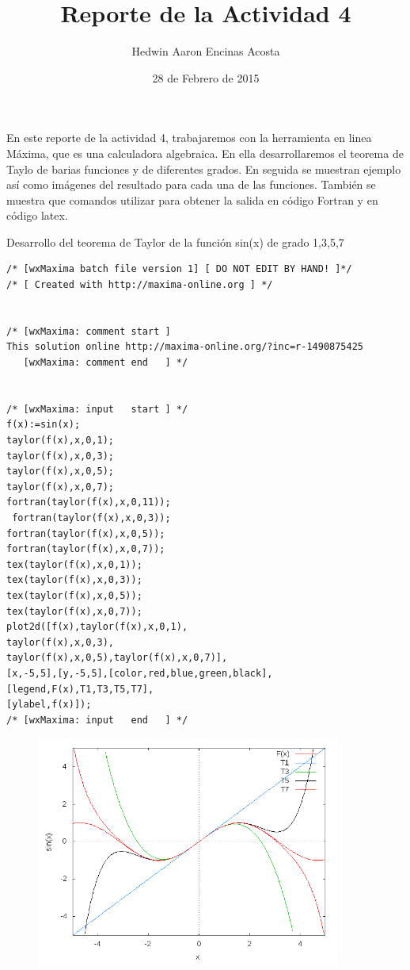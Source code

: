 \documentclass[12pt]{article}
\title{Reporte de la Actividad 4}
\author{Hedwin Aaron Encinas Acosta}
\date{28 de Febrero de 2015}
\begin{document}
\maketitle


\section{}
En este  reporte de la actividad 4, trabajaremos con la herramienta en linea Máxima, que es una calculadora algebraica. En ella desarrollaremos el teorema de Taylo de barias funciones y de diferentes grados. En seguida se muestran ejemplo así como imágenes del resultado para cada una de las funciones.
También se muestra que comandos utilizar para obtener la salida en código Fortran y en código latex.



Desarrollo del teorema de Taylor de la función sin(x) de grado 1,3,5,7
\begin{verbatim}
/* [wxMaxima batch file version 1] [ DO NOT EDIT BY HAND! ]*/
/* [ Created with http://maxima-online.org ] */


/* [wxMaxima: comment start ]
This solution online http://maxima-online.org/?inc=r-1490875425
   [wxMaxima: comment end   ] */


/* [wxMaxima: input   start ] */
f(x):=sin(x);
taylor(f(x),x,0,1);
taylor(f(x),x,0,3);
taylor(f(x),x,0,5);
taylor(f(x),x,0,7);
fortran(taylor(f(x),x,0,11));
 fortran(taylor(f(x),x,0,3));
fortran(taylor(f(x),x,0,5));
fortran(taylor(f(x),x,0,7));
tex(taylor(f(x),x,0,1));
tex(taylor(f(x),x,0,3));
tex(taylor(f(x),x,0,5));
tex(taylor(f(x),x,0,7));
plot2d([f(x),taylor(f(x),x,0,1),
taylor(f(x),x,0,3),
taylor(f(x),x,0,5),taylor(f(x),x,0,7)],
[x,-5,5],[y,-5,5],[color,red,blue,green,black],[legend,F(x),T1,T3,T5,T7],
[ylabel,f(x)]);
/* [wxMaxima: input   end   ] */
 \end{verbatim}
 
 \begin{figure}[h]
  \centering
    \includegraphics[width=10cm]{sen.png}
  \end{figure}
 
\end{document}
